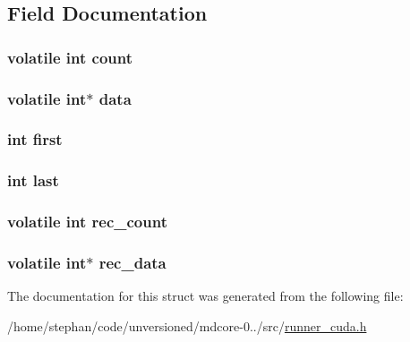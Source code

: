 \subsection{Field Documentation}
\hypertarget{structqueue__cuda_ab2caed1cbe66b4adb794da880e147fdc}{
\subsubsection[{count}]{\setlength{\rightskip}{0pt plus 5cm}volatile int count}}\label{structqueue__cuda_ab2caed1cbe66b4adb794da880e147fdc}
\hypertarget{structqueue__cuda_aa9110aa2633e6059a5929565aefaf3ec}{
\subsubsection[{data}]{\setlength{\rightskip}{0pt plus 5cm}volatile int$\ast$ data}}\label{structqueue__cuda_aa9110aa2633e6059a5929565aefaf3ec}
\hypertarget{structqueue__cuda_a6c8ec3c3e77241328358d43697f6f840}{
\subsubsection[{first}]{\setlength{\rightskip}{0pt plus 5cm}int first}}\label{structqueue__cuda_a6c8ec3c3e77241328358d43697f6f840}
\hypertarget{structqueue__cuda_a72e27dee31b1c4c6a504fbed29542d97}{
\subsubsection[{last}]{\setlength{\rightskip}{0pt plus 5cm}int last}}\label{structqueue__cuda_a72e27dee31b1c4c6a504fbed29542d97}
\hypertarget{structqueue__cuda_aa2f0192d7cc598812ece12dc8acb1a4a}{
\subsubsection[{rec\-\_\-count}]{\setlength{\rightskip}{0pt plus 5cm}volatile int rec\-\_\-count}}\label{structqueue__cuda_aa2f0192d7cc598812ece12dc8acb1a4a}
\hypertarget{structqueue__cuda_a0d911ca38ccdae3becea0f18836a3c90}{
\subsubsection[{rec\-\_\-data}]{\setlength{\rightskip}{0pt plus 5cm}volatile int$\ast$ rec\-\_\-data}}\label{structqueue__cuda_a0d911ca38ccdae3becea0f18836a3c90}


The documentation for this struct was generated from the following file\-:\begin{DoxyCompactItemize}
\item 
/home/stephan/code/unversioned/mdcore-\/0../src/\hyperlink{runner__cuda_8h}{runner\-\_\-cuda.\-h}\end{DoxyCompactItemize}
